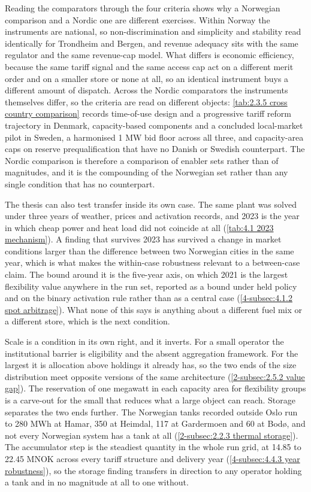 Reading the comparators through the four criteria shows why a Norwegian comparison and a Nordic one are different exercises. Within Norway the instruments are national, so non-discrimination and simplicity and stability read identically for Trondheim and Bergen, and revenue adequacy sits with the same regulator and the same revenue-cap model. What differs is economic efficiency, because the same tariff signal and the same access cap act on a different merit order and on a smaller store or none at all, so an identical instrument buys a different amount of dispatch. Across the Nordic comparators the instruments themselves differ, so the criteria are read on different objects: \autoref{tab:2.3.5 cross country comparison} records time-of-use design and a progressive tariff reform trajectory in Denmark, capacity-based components and a concluded local-market pilot in Sweden, a harmonised 1 MW bid floor across all three, and capacity-area caps on reserve prequalification that have no Danish or Swedish counterpart. The Nordic comparison is therefore a comparison of enabler sets rather than of magnitudes, and it is the compounding of the Norwegian set rather than any single condition that has no counterpart.

The thesis can also test transfer inside its own case. The same plant was solved under three years of weather, prices and activation records, and 2023 is the year in which cheap power and heat load did not coincide at all (\autoref{tab:4.1 2023 mechanism}). A finding that survives 2023 has survived a change in market conditions larger than the difference between two Norwegian cities in the same year, which is what makes the within-case robustness relevant to a between-case claim. The bound around it is the five-year axis, on which 2021 is the largest flexibility value anywhere in the run set, reported as a bound under held policy and on the binary activation rule rather than as a central case (\autoref{4-subsec:4.1.2 spot arbitrage}). What none of this says is anything about a different fuel mix or a different store, which is the next condition.

Scale is a condition in its own right, and it inverts. For a small operator the institutional barrier is eligibility and the absent aggregation framework. For the largest it is allocation above holdings it already has, so the two ends of the size distribution meet opposite versions of the same architecture (\autoref{2-subsec:2.5.2 value gap}). The reservation of one megawatt in each capacity area for flexibility groups is a carve-out for the small that reduces what a large object can reach. Storage separates the two ends further. The Norwegian tanks recorded outside Oslo run to 280 MWh at Hamar, 350 at Heimdal, 117 at Gardermoen and 60 at Bodø, and not every Norwegian system has a tank at all (\autoref{2-subsec:2.2.3 thermal storage}). The accumulator step is the steadiest quantity in the whole run grid, at 14.85 to 22.45 MNOK across every tariff structure and delivery year (\autoref{4-subsec:4.4.3 year robustness}), so the storage finding transfers in direction to any operator holding a tank and in no magnitude at all to one without.


